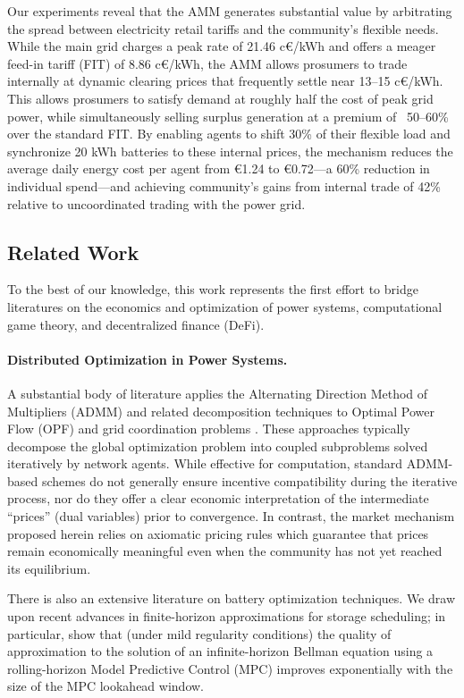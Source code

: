 \documentclass[12pt, notitlepage]{article}
\begin{document}
Our experiments reveal that the AMM generates substantial value by arbitrating the spread between electricity retail tariffs and the community's flexible needs. While the main grid charges a peak rate of 21.46 c€/kWh and offers a meager feed-in tariff (FIT) of 8.86 c€/kWh, the AMM allows prosumers to trade internally at dynamic clearing prices that frequently settle near 13--15 c€/kWh. This allows prosumers to satisfy demand at roughly half the cost of peak grid power, while simultaneously selling surplus generation at a premium of ~50–60\% over the standard FIT. By enabling agents to shift 30\% of their flexible load and synchronize 20 kWh batteries to these internal prices, the mechanism reduces the average daily energy cost per agent from €1.24 to €0.72—a 60\% reduction in individual spend—and achieving community's gains from internal trade of 42\% relative to uncoordinated trading with the power grid. 


\subsection*{Related Work}

To the best of our knowledge, this work represents the first effort to bridge literatures on the economics and optimization of power systems, computational game theory, and decentralized finance (DeFi).

\paragraph{Distributed Optimization in Power Systems.} A substantial body of literature applies the Alternating Direction Method of Multipliers (ADMM) and related decomposition techniques to Optimal Power Flow (OPF) and grid coordination problems \citep{boyd2011admm,erseghe2014opf,Moret2024}. These approaches typically decompose the global optimization problem into coupled subproblems solved iteratively by network agents. While effective for computation, standard ADMM-based schemes do not generally ensure incentive compatibility during the iterative process, nor do they offer a clear economic interpretation of the intermediate ``prices'' (dual variables) prior to convergence. In contrast, the market mechanism proposed herein relies on axiomatic pricing rules which guarantee that  prices remain economically meaningful even when the community has not yet reached its equilibrium. 

There is also an extensive literature on battery optimization techniques. We draw upon recent advances in finite-horizon approximations for storage scheduling; in particular, \citep{prat2024finitehorizon} show that (under mild regularity conditions) the quality of approximation to the solution of an infinite-horizon Bellman equation using a rolling-horizon Model Predictive Control (MPC) improves exponentially with the size of the MPC lookahead window.
\end{document}
